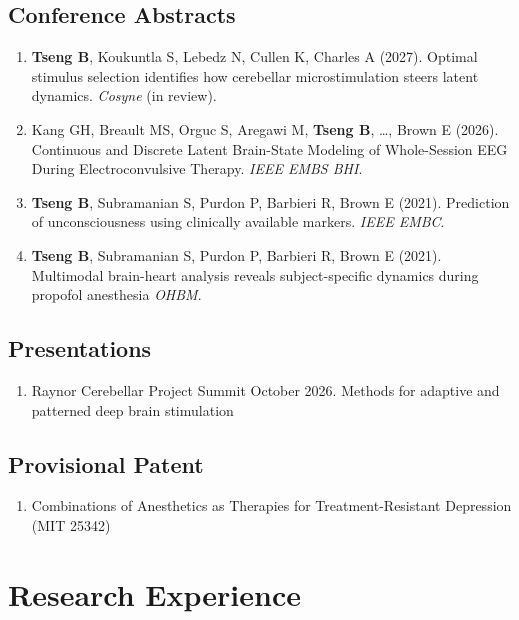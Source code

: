 \documentclass[11pt,letterpaper]{article}
\begin{document}
\subsection*{Conference Abstracts}

\begin{enumerate}
\item \textbf{Tseng B}, Koukuntla S, Lebedz N, Cullen K, Charles A (2027). Optimal stimulus selection identifies how cerebellar microstimulation steers latent dynamics. \textit{Cosyne} (in review).

\item Kang GH, Breault MS, Orguc S, Aregawi M, \textbf{Tseng B}, \ldots, Brown E (2026). Continuous and Discrete Latent Brain-State Modeling of Whole-Session EEG During Electroconvulsive Therapy. \textit{IEEE EMBS BHI}.

\item \textbf{Tseng B}, Subramanian S, Purdon P, Barbieri R, Brown E (2021). Prediction of unconsciousness using clinically available markers. \textit{IEEE EMBC}.

\item \textbf{Tseng B}, Subramanian S, Purdon P, Barbieri R, Brown E (2021). Multimodal brain-heart analysis reveals subject-specific dynamics during propofol anesthesia \textit{OHBM}.
\end{enumerate}

\subsection*{Presentations}

\begin{enumerate}
\item Raynor Cerebellar Project Summit October 2026. Methods for adaptive and patterned deep brain stimulation
\end{enumerate}

\subsection*{Provisional Patent}

\begin{enumerate}
\item Combinations of Anesthetics as Therapies for Treatment-Resistant Depression (MIT 25342)
\end{enumerate}

\section*{Research Experience}
\end{document}
